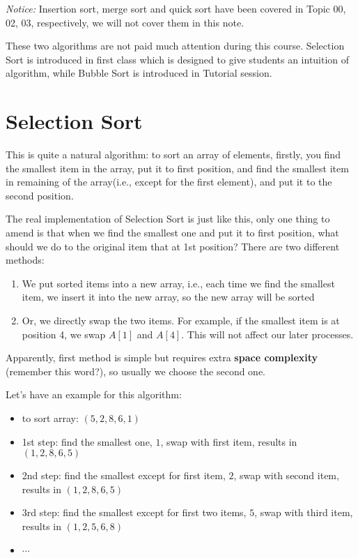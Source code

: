 
\begin{spacing}{1.3}

    {\it Notice: } Insertion sort, merge sort and 
    quick sort have been covered in Topic 00, 02, 03,
    respectively, we will not cover them in this note.

    These two algorithms are not paid much attention during this course.
    Selection Sort is introduced in first class which is designed to give students
    an intuition of algorithm, while Bubble Sort is introduced in Tutorial session.
    
    \section{Selection Sort}

    This is quite a natural algorithm: to sort an array of elements, firstly, you
    find the smallest item in the array, put it to first position, and 
    find the smallest item in remaining of the array(i.e., except for the 
    first element), and put it to the second position.

    The real implementation of Selection Sort is just like this, only one thing 
    to amend is that when we find the smallest one and put it to first position, 
    what should we do to the original item that at 1st position? 
    There are two different methods:
    \begin{enumerate}
        \item We put sorted items into a new array, i.e., each time we find the smallest 
        item, we insert it into the new array, so the new array will be sorted
        \item Or, we directly swap the two items. For example, if the smallest 
        item is at position 4, we swap $A[1]$ and $A[4]$. This will not affect 
        our later processes.
    \end{enumerate}
    Apparently, first method is simple but requires extra {\bf space complexity}
    (remember this word?), so usually we choose the second one.

    Let's have an example for this algorithm:
    \begin{itemize}
        \item to sort array: $(5,2,8,6,1)$ 
        \item 1st step: find the smallest one, $1$, swap with first item, 
        results in $(1,2,8,6,5)$
        \item 2nd step: find the smallest except for first item, $2$, swap with second item, 
        results in $(1,2,8,6,5)$
        \item 3rd step: find the smallest except for first two items, $5$, swap with third item, 
        results in $(1,2,5,6,8)$
        \item $\cdots$
    \end{itemize}


\end{spacing}
